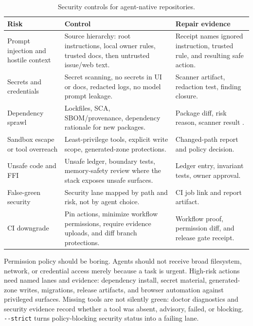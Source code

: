 \begin{table}[t]
\caption{Security controls for agent-native repositories.}
\label{tab:security-controls}
\centering
\small
\begin{tabularx}{\textwidth}{L{0.18\textwidth} Y Y}
\toprule
\textbf{Risk} & \textbf{Control} & \textbf{Repair evidence} \\
\midrule
Prompt injection and hostile context & Source hierarchy: root instructions, local owner rules, trusted docs, then untrusted issue/web text. & Receipt names ignored instruction, trusted rule, and resulting safe action. \\
Secrets and credentials & Secret scanning, no secrets in UI or docs, redacted logs, no model prompt leakage. & Scanner artifact, redaction test, finding closure. \\
Dependency sprawl & Lockfiles, SCA, SBOM/provenance, dependency rationale for new packages. & Package diff, risk reason, scanner result \cite{githubSecretScanning2026,osvScanner2026,slsaSpec2026}. \\
Sandbox escape or tool overreach & Least-privilege tools, explicit write scope, generated-zone protections. & Changed-path report and policy decision. \\
Unsafe code and FFI & Unsafe ledger, boundary tests, memory-safety review where the stack exposes unsafe surfaces. & Ledger entry, invariant tests, owner approval. \\
False-green security & Security lane mapped by path and risk, not by agent choice. & CI job link and report artifact. \\
CI downgrade & Pin actions, minimize workflow permissions, require evidence uploads, and diff branch protections. & Workflow proof, permission diff, and release gate receipt. \\
\bottomrule
\end{tabularx}
\end{table}

Permission policy should be boring. Agents should not receive broad filesystem, network, or credential access merely because a task is urgent. High-risk actions need named lanes and evidence: dependency install, secret material, generated-zone writes, migrations, release artifacts, and browser automation against privileged surfaces. Missing tools are not silently green: doctor diagnostics and security evidence record whether a tool was absent, advisory, failed, or blocking. \verb|--strict| turns policy-blocking security status into a failing lane.
